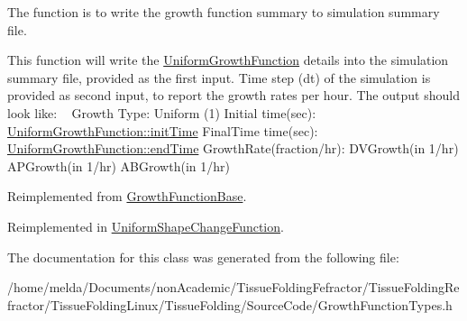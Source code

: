 The function is to write the growth function summary to simulation summary file. 

This function will write the \hyperlink{classUniformGrowthFunction}{Uniform\+Growth\+Function} details into the simulation summary file, provided as the first input. Time step (dt) of the simulation is provided as second input, to report the growth rates per hour. The output should look like\+: ~\newline
 Growth Type\+: Uniform (1) Initial time(sec)\+: \hyperlink{classGrowthFunctionBase_ae92513a7b41637df8e26e7db35ddf97c}{Uniform\+Growth\+Function\+::init\+Time} Final\+Time time(sec)\+: \hyperlink{classGrowthFunctionBase_a3ff4db0573d354a75666a5f3ca446941}{Uniform\+Growth\+Function\+::end\+Time} Growth\+Rate(fraction/hr)\+: D\+V\+Growth(in 1/hr) A\+P\+Growth(in 1/hr) A\+B\+Growth(in 1/hr)

Reimplemented from \hyperlink{classGrowthFunctionBase_ad6403a702f3ed53984083904755a832b}{Growth\+Function\+Base}.



Reimplemented in \hyperlink{classUniformShapeChangeFunction_a336ad7754afb58309fd3af82913fab83}{Uniform\+Shape\+Change\+Function}.



The documentation for this class was generated from the following file\+:\begin{DoxyCompactItemize}
\item 
/home/melda/\+Documents/non\+Academic/\+Tissue\+Folding\+Fefractor/\+Tissue\+Folding\+Refractor/\+Tissue\+Folding\+Linux/\+Tissue\+Folding/\+Source\+Code/Growth\+Function\+Types.\+h\end{DoxyCompactItemize}
